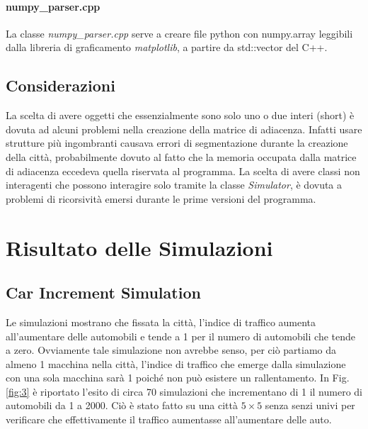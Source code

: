 \documentclass{article}
\newcommand{\ii}[1]{\textit{#1}}
\begin{document}
        \paragraph{numpy\_parser.cpp}
        La classe \ii{numpy\_parser.cpp} serve a creare file python con numpy.array leggibili dalla libreria di graficamento \ii{matplotlib}, 
            a partire da std::vector del C++.
    
    \subsection{Considerazioni}
        La scelta di avere oggetti che essenzialmente sono solo uno o due interi (short) è dovuta ad alcuni problemi nella creazione della matrice di adiacenza.
        Infatti usare strutture più ingombranti causava errori di segmentazione durante la creazione della città, probabilmente dovuto al fatto che la memoria
        occupata dalla matrice di adiacenza eccedeva quella riservata al programma.
        La scelta di avere classi non interagenti che possono interagire solo tramite la classe \ii{Simulator}, è dovuta a problemi di ricorsività
        emersi durante le prime versioni del programma.

\section{Risultato delle Simulazioni}
    
    \subsection{Car Increment Simulation}
        Le simulazioni mostrano che fissata la città, l'indice di traffico aumenta all'aumentare delle automobili
        e tende a 1 per il numero di automobili che tende a zero. Ovviamente tale simulazione non avrebbe senso, per ciò 
        partiamo da almeno 1 macchina nella città, l'indice di traffico che emerge dalla simulazione con una sola macchina
        sarà 1 poiché non può esistere un rallentamento.
        In Fig. \ref{fig:3} è riportato l'esito di circa 70 simulazioni che incrementano di 1 il numero di automobili da 1 a 2000.
        Ciò è stato fatto su una città $5 \times 5$ senza senzi univi per verificare che effettivamente il traffico aumentasse
        all'aumentare delle auto.
\end{document}
